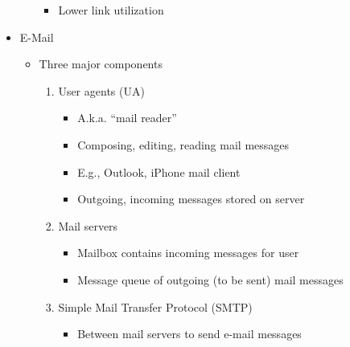 \begin{itemize}
\begin{itemize}
\begin{itemize}
          \item Lower link utilization

        \end{itemize}

    \end{itemize}

  \item E-Mail

    \begin{itemize}

      \item Three major components

        \begin{enumerate}

          \item User agents (UA)

            \begin{itemize}

              \item A.k.a. ``mail reader''

              \item Composing, editing, reading mail messages

              \item E.g., Outlook, iPhone mail client

              \item Outgoing, incoming messages stored on server

            \end{itemize}

          \item Mail servers

            \begin{itemize}

              \item Mailbox contains incoming messages for user

              \item Message queue of outgoing (to be sent) mail messages

            \end{itemize}

          \item Simple Mail Transfer Protocol (SMTP)

            \begin{itemize}

              \item Between mail servers to send e-mail messages


\end{itemize}
\end{enumerate}
\end{itemize}
\end{itemize}
